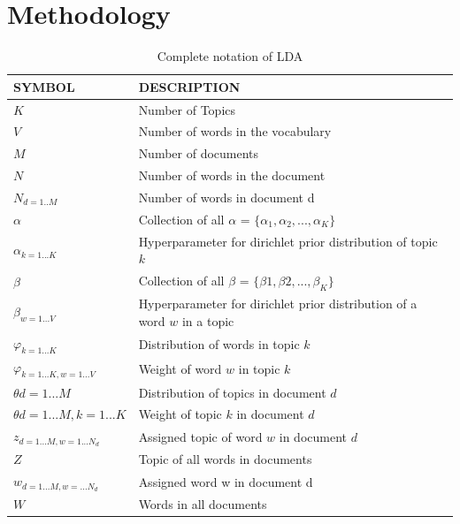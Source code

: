 \chapter{Methodology}  \label{ch:methodology}

\begin{table}[h]
\centering
 \begin{tabular}{l l} 
 \hline
 SYMBOL & DESCRIPTION \\ 
 \hline
 $K$ & Number of Topics \\  
 $V$ & Number of words in the vocabulary \\
 $M$ & Number of documents \\
 $N$ & Number of words in the document \\
 $N_{d=1..M}$ & Number of words in document d\\
 $\alpha$ & Collection of all $\alpha$ = $ \{ \alpha_{1},\alpha_{2}, ... , \alpha_{K}\}$ \\
 $\alpha_{k=1...K}$ & Hyperparameter for dirichlet prior distribution of topic $k$ \\
 $\beta$ &  Collection of all $\beta$ = $\{\beta{1},\beta{2}, ... , \beta_{K}\}$ \\
 $\beta_{w=1...V}$ & Hyperparameter for dirichlet prior distribution of a word $w$ in a topic \\
 $\varphi_{k=1...K}$ & Distribution of words in topic $k$ \\
 $\varphi_{k=1...K, w=1...V}$ & Weight of  word $w$ in topic $k$  \\
 $\theta{d=1...M}$ & Distribution of topics in document $d$  \\
 $\theta{d=1...M, k=1...K}$ & Weight of  topic $k$ in document $d$ \\
 $z_{d=1...M, w=1...N_d}$ & Assigned topic of word $w$ in document $d$\\
 $Z$ & Topic of all words in documents \\
 $w_{d=1...M, w=...N_d}$ & Assigned word w in document d \\ 
 $W$ & Words in all documents \\ 

 \hline
 \end{tabular}
\caption{Complete notation of LDA}
\label{tab:table1}
\end{table}

